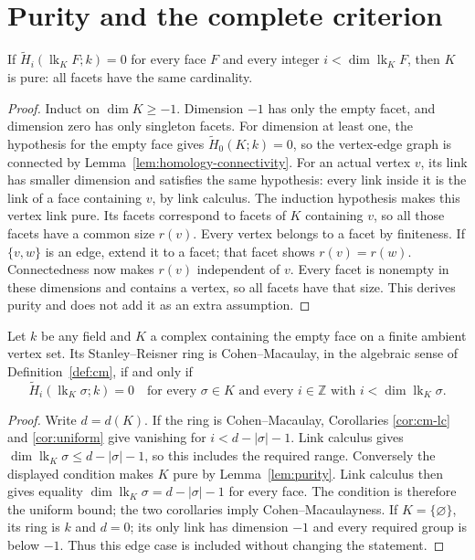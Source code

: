 \section{Purity and the complete criterion}

\begin{lemma}\label{lem:purity}
If $\widetilde H_i(\operatorname{lk}_K F;k)=0$ for every face $F$ and
every integer $i<\dim\operatorname{lk}_K F$, then $K$ is pure: all facets
have the same cardinality.
\end{lemma}
\begin{proof}
Induct on $\dim K\ge-1$. Dimension $-1$ has only the empty facet, and
dimension zero has only singleton facets. For dimension at least one,
the hypothesis for the empty face gives $\widetilde H_0(K;k)=0$, so the
vertex-edge graph is connected by Lemma~\ref{lem:homology-connectivity}.
For an actual vertex $v$, its link has
smaller dimension and satisfies the same hypothesis: every link inside it
is the link of a face containing $v$, by link calculus. The induction
hypothesis makes this vertex link pure. Its facets correspond to facets
of $K$ containing $v$, so all those facets have a common size $r(v)$.
Every vertex belongs to a facet by finiteness. If $\{v,w\}$ is an edge,
extend it to a facet; that facet shows $r(v)=r(w)$. Connectedness now
makes $r(v)$ independent of $v$. Every facet is nonempty in these
dimensions and contains a vertex, so all facets have that size. This
derives purity and does not add it as an extra assumption.
\end{proof}

\begin{theorem}\label{thm:reisner}
Let $k$ be any field and $K$ a complex containing the empty face on a
finite ambient vertex set. Its Stanley--Reisner ring is Cohen--Macaulay, in the
algebraic sense of Definition~\ref{def:cm}, if and only if
\[
 \widetilde H_i(\operatorname{lk}_K\sigma;k)=0
 \quad\text{for every }\sigma\in K\text{ and every }
 i\in\mathbb Z\text{ with }i<\dim\operatorname{lk}_K\sigma.
\]
\end{theorem}
\begin{proof}
Write $d=d(K)$. If the ring is Cohen--Macaulay, Corollaries
\ref{cor:cm-lc} and \ref{cor:uniform} give vanishing for
$i<d-|\sigma|-1$. Link calculus gives
$\dim\operatorname{lk}_K\sigma\le d-|\sigma|-1$, so this includes the
required range. Conversely the displayed condition makes $K$ pure by
Lemma~\ref{lem:purity}. Link calculus then gives equality
$\dim\operatorname{lk}_K\sigma=d-|\sigma|-1$ for every face.
The condition is therefore the uniform bound; the two corollaries imply
Cohen--Macaulayness. If $K=\{\varnothing\}$, its ring is $k$ and $d=0$;
its only link has dimension $-1$ and every required group is below $-1$.
Thus this edge case is included without changing the statement.
\end{proof}

